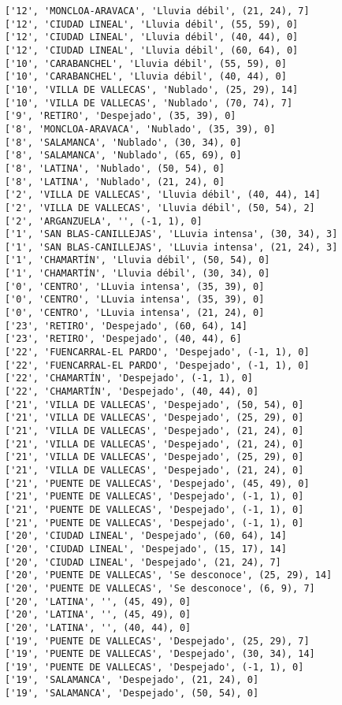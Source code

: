 \documentclass[11pt]{article}
\begin{document}
\begin{Verbatim}[commandchars=\\\{\}]
['12', 'MONCLOA-ARAVACA', 'Lluvia débil', (21, 24), 7]
['12', 'CIUDAD LINEAL', 'Lluvia débil', (55, 59), 0]
['12', 'CIUDAD LINEAL', 'Lluvia débil', (40, 44), 0]
['12', 'CIUDAD LINEAL', 'Lluvia débil', (60, 64), 0]
['10', 'CARABANCHEL', 'Lluvia débil', (55, 59), 0]
['10', 'CARABANCHEL', 'Lluvia débil', (40, 44), 0]
['10', 'VILLA DE VALLECAS', 'Nublado', (25, 29), 14]
['10', 'VILLA DE VALLECAS', 'Nublado', (70, 74), 7]
['9', 'RETIRO', 'Despejado', (35, 39), 0]
['8', 'MONCLOA-ARAVACA', 'Nublado', (35, 39), 0]
['8', 'SALAMANCA', 'Nublado', (30, 34), 0]
['8', 'SALAMANCA', 'Nublado', (65, 69), 0]
['8', 'LATINA', 'Nublado', (50, 54), 0]
['8', 'LATINA', 'Nublado', (21, 24), 0]
['2', 'VILLA DE VALLECAS', 'Lluvia débil', (40, 44), 14]
['2', 'VILLA DE VALLECAS', 'Lluvia débil', (50, 54), 2]
['2', 'ARGANZUELA', '', (-1, 1), 0]
['1', 'SAN BLAS-CANILLEJAS', 'LLuvia intensa', (30, 34), 3]
['1', 'SAN BLAS-CANILLEJAS', 'LLuvia intensa', (21, 24), 3]
['1', 'CHAMARTÍN', 'Lluvia débil', (50, 54), 0]
['1', 'CHAMARTÍN', 'Lluvia débil', (30, 34), 0]
['0', 'CENTRO', 'LLuvia intensa', (35, 39), 0]
['0', 'CENTRO', 'LLuvia intensa', (35, 39), 0]
['0', 'CENTRO', 'LLuvia intensa', (21, 24), 0]
['23', 'RETIRO', 'Despejado', (60, 64), 14]
['23', 'RETIRO', 'Despejado', (40, 44), 6]
['22', 'FUENCARRAL-EL PARDO', 'Despejado', (-1, 1), 0]
['22', 'FUENCARRAL-EL PARDO', 'Despejado', (-1, 1), 0]
['22', 'CHAMARTÍN', 'Despejado', (-1, 1), 0]
['22', 'CHAMARTÍN', 'Despejado', (40, 44), 0]
['21', 'VILLA DE VALLECAS', 'Despejado', (50, 54), 0]
['21', 'VILLA DE VALLECAS', 'Despejado', (25, 29), 0]
['21', 'VILLA DE VALLECAS', 'Despejado', (21, 24), 0]
['21', 'VILLA DE VALLECAS', 'Despejado', (21, 24), 0]
['21', 'VILLA DE VALLECAS', 'Despejado', (25, 29), 0]
['21', 'VILLA DE VALLECAS', 'Despejado', (21, 24), 0]
['21', 'PUENTE DE VALLECAS', 'Despejado', (45, 49), 0]
['21', 'PUENTE DE VALLECAS', 'Despejado', (-1, 1), 0]
['21', 'PUENTE DE VALLECAS', 'Despejado', (-1, 1), 0]
['21', 'PUENTE DE VALLECAS', 'Despejado', (-1, 1), 0]
['20', 'CIUDAD LINEAL', 'Despejado', (60, 64), 14]
['20', 'CIUDAD LINEAL', 'Despejado', (15, 17), 14]
['20', 'CIUDAD LINEAL', 'Despejado', (21, 24), 7]
['20', 'PUENTE DE VALLECAS', 'Se desconoce', (25, 29), 14]
['20', 'PUENTE DE VALLECAS', 'Se desconoce', (6, 9), 7]
['20', 'LATINA', '', (45, 49), 0]
['20', 'LATINA', '', (45, 49), 0]
['20', 'LATINA', '', (40, 44), 0]
['19', 'PUENTE DE VALLECAS', 'Despejado', (25, 29), 7]
['19', 'PUENTE DE VALLECAS', 'Despejado', (30, 34), 14]
['19', 'PUENTE DE VALLECAS', 'Despejado', (-1, 1), 0]
['19', 'SALAMANCA', 'Despejado', (21, 24), 0]
['19', 'SALAMANCA', 'Despejado', (50, 54), 0]

\end{Verbatim}
\end{document}
